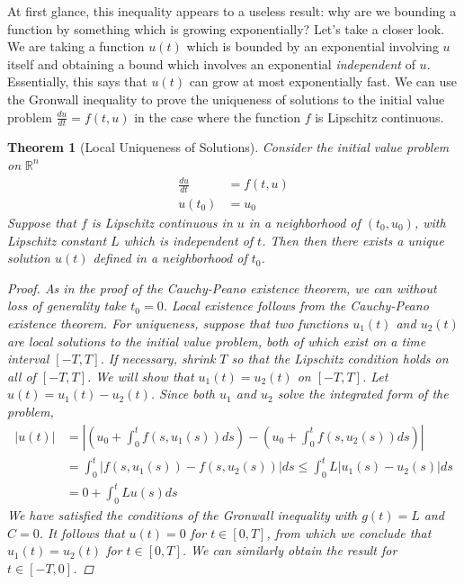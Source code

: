 \documentclass[12pt]{amsart}         %
\newtheorem{theorem}{Theorem}[section]
\theoremstyle{remark}
\newcommand{\R}{\mathbb{R}}
\begin{document}
At first glance, this inequality appears to a useless result: why are we bounding a function by something which is growing exponentially? Let's take a closer look. We are taking a function $u(t)$ which is bounded by an exponential involving $u$ itself and obtaining a bound which involves an exponential \emph{independent} of $u$. Essentially, this says that $u(t)$ can grow at most exponentially fast. We can use the Gronwall inequality to prove the uniqueness of solutions to the initial value problem $\frac{du}{dt} = f(t, u)$ in the case where the function $f$ is Lipschitz continuous.

\begin{theorem}[Local Uniqueness of Solutions]
Consider the initial value problem on $\R^n$
\begin{align*}
\frac{du}{dt} &= f(t, u) \\
u(t_0) &= u_0
\end{align*}
Suppose that $f$ is Lipschitz continuous in $u$ in a neighborhood of $(t_0, u_0)$, with Lipschitz constant $L$ which is independent of $t$. Then then there exists a \emph{unique} solution $u(t)$ defined in a neighborhood of $t_0$.
\begin{proof}
As in the proof of the Cauchy-Peano existence theorem, we can without loss of generality take $t_0 = 0$. Local existence follows from the Cauchy-Peano existence theorem. For uniqueness, suppose that two functions $u_1(t)$ and $u_2(t)$ are local solutions to the initial value problem, both of which exist on a time interval $[-T,T]$. If necessary, shrink $T$ so that the Lipschitz condition holds on all of $[-T,T]$. We will show that $u_1(t) = u_2(t)$ on $[-T,T]$. Let $u(t) = u_1(t) - u_2(t)$. Since both $u_1$ and $u_2$ solve the integrated form of the problem,
\begin{align*}
|u(t)| &= \left| \left( u_0 + \int_0^t f(s, u_1(s))ds \right) - \left( u_0 + \int_0^t f(s, u_2(s))ds \right)  \right| \\
&= \int_0^t | f(s, u_1(s)) - f(s, u_2(s)) | ds
\leq \int_0^t L |u_1(s) - u_2(s)| ds \\
&= 0 + \int_0^t L u(s) ds
\end{align*}
We have satisfied the conditions of the Gronwall inequality with $g(t) = L$ and $C = 0$. It follows that $u(t) = 0$ for $t \in [0,T]$, from which we conclude that $u_1(t) = u_2(t)$ for $t \in [0,T]$. We can similarly obtain the result for $t \in [-T,0]$.
\end{proof}
\end{theorem}
\end{document}
